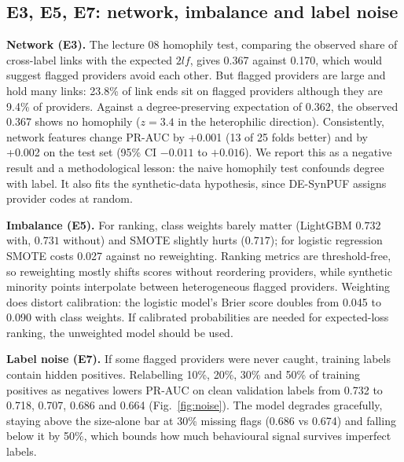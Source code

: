 \documentclass[11pt,a4paper]{article}
\begin{document}
\subsection{E3, E5, E7: network, imbalance and label noise}

\textbf{Network (E3).} The lecture 08 homophily test, comparing the observed share of cross-label links with the expected $2lf$, gives 0.367 against 0.170, which would suggest flagged providers avoid each other. But flagged providers are large and hold many links: 23.8\% of link ends sit on flagged providers although they are 9.4\% of providers. Against a degree-preserving expectation of 0.362, the observed 0.367 shows no homophily ($z=3.4$ in the heterophilic direction). Consistently, network features change PR-AUC by +0.001 (13 of 25 folds better) and by +0.002 on the test set (95\% CI $-0.011$ to $+0.016$). We report this as a negative result and a methodological lesson: the naive homophily test confounds degree with label. It also fits the synthetic-data hypothesis, since DE-SynPUF assigns provider codes at random.

\textbf{Imbalance (E5).} For ranking, class weights barely matter (LightGBM $0.732$ with, $0.731$ without) and SMOTE slightly hurts ($0.717$); for logistic regression SMOTE costs 0.027 against no reweighting. Ranking metrics are threshold-free, so reweighting mostly shifts scores without reordering providers, while synthetic minority points interpolate between heterogeneous flagged providers. Weighting does distort calibration: the logistic model's Brier score doubles from 0.045 to 0.090 with class weights. If calibrated probabilities are needed for expected-loss ranking, the unweighted model should be used.

\textbf{Label noise (E7).} If some flagged providers were never caught, training labels contain hidden positives. Relabelling 10\%, 20\%, 30\% and 50\% of training positives as negatives lowers PR-AUC on clean validation labels from 0.732 to 0.718, 0.707, 0.686 and 0.664 (Fig.~\ref{fig:noise}). The model degrades gracefully, staying above the size-alone bar at 30\% missing flags (0.686 vs 0.674) and falling below it by 50\%, which bounds how much behavioural signal survives imperfect labels.
\end{document}
